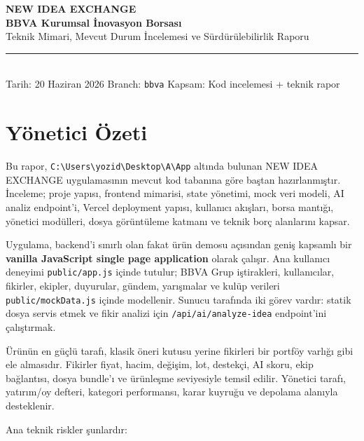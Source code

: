 \documentclass[11pt,a4paper]{article}
\newcommand{\docline}{\noindent\rule{\textwidth}{0.4pt}}
\newcommand{\code}[1]{\texttt{#1}}
\begin{document}
\begin{center}
{\Large\bfseries NEW IDEA EXCHANGE}\\[3pt]
{\large\bfseries BBVA Kurumsal İnovasyon Borsası}\\[6pt]
{\large Teknik Mimari, Mevcut Durum İncelemesi ve Sürdürülebilirlik Raporu}\\[8pt]
\docline\\[6pt]
{\small Tarih: 20 Haziran 2026 \quad Branch: \code{bbva} \quad Kapsam: Kod incelemesi + teknik rapor}
\end{center}

\tableofcontents
\newpage

\section{Yönetici Özeti}

Bu rapor, \code{C:\textbackslash Users\textbackslash yozid\textbackslash Desktop\textbackslash A\textbackslash App} altında bulunan NEW IDEA EXCHANGE uygulamasının mevcut kod tabanına göre baştan hazırlanmıştır. İnceleme; proje yapısı, frontend mimarisi, state yönetimi, mock veri modeli, AI analiz endpoint'i, Vercel deployment yapısı, kullanıcı akışları, borsa mantığı, yönetici modülleri, dosya görüntüleme katmanı ve teknik borç alanlarını kapsar.

Uygulama, backend'i sınırlı olan fakat ürün demosu açısından geniş kapsamlı bir \textbf{vanilla JavaScript single page application} olarak çalışır. Ana kullanıcı deneyimi \code{public/app.js} içinde tutulur; BBVA Grup iştirakleri, kullanıcılar, fikirler, ekipler, duyurular, gündem, yarışmalar ve kulüp verileri \code{public/mockData.js} içinde modellenir. Sunucu tarafında iki görev vardır: statik dosya servis etmek ve fikir analizi için \code{/api/ai/analyze-idea} endpoint'ini çalıştırmak.

Ürünün en güçlü tarafı, klasik öneri kutusu yerine fikirleri bir portföy varlığı gibi ele almasıdır. Fikirler fiyat, hacim, değişim, lot, destekçi, AI skoru, ekip bağlantısı, dosya bundle'ı ve ürünleşme seviyesiyle temsil edilir. Yönetici tarafı, yatırım/oy defteri, kategori performansı, karar kuyruğu ve depolama alanıyla desteklenir.

Ana teknik riskler şunlardır:
\end{document}
